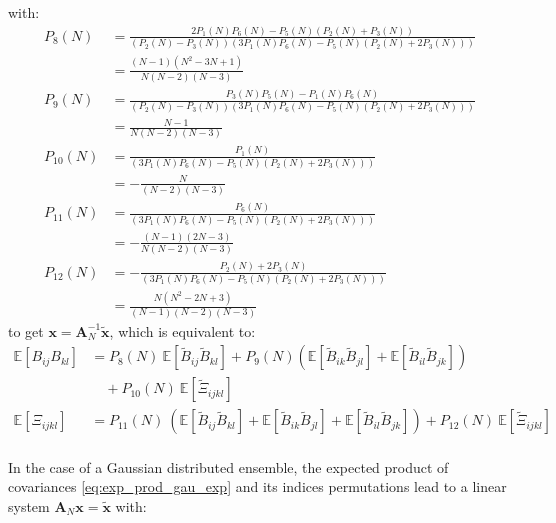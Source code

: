 \documentclass[12pt]{scrartcl}
\begin{document}
with:
\begin{subequations}
\begin{align}
P_8(N) & = \frac{2 P_1(N) P_6(N) - P_5(N)\left(P_2(N)+P_3(N)\right)}{\left(P_2(N)-P_3(N)\right)\left(3 P_1(N) P_6(N) - P_5(N) \left(P_2(N) + 2P_3(N)\right)\right)} \nonumber \\
& = \frac{(N-1)(N^2-3N+1)}{N(N-2)(N-3)} \\
P_9(N) & = \frac{P_3(N) P_5(N) - P_1(N) P_6(N)}{\left(P_2(N)-P_3(N)\right)\left(3 P_1(N) P_6(N) - P_5(N) \left(P_2(N) + 2 P_3(N)\right)\right)} \nonumber \\
& = \frac{N-1}{N(N-2)(N-3)} \\
P_{10}(N) & = \frac{P_1(N)}{\left(3 P_1(N) P_6(N) - P_5(N) \left(P_2(N) + 2P_3(N)\right)\right)} \nonumber \\
& = -\frac{N}{(N-2)(N-3)} \\
P_{11}(N) & = \frac{P_6(N)}{\left(3 P_1(N) P_6(N) - P_5(N) \left(P_2(N) + 2P_3(N)\right)\right)} \nonumber \\
& = -\frac{(N-1)(2N-3)}{N(N-2)(N-3)} \\
P_{12}(N) & = -\frac{P_2(N)+2 P_3(N)}{\left(3 P_1(N) P_6(N) - P_5(N) \left(P_2(N) + 2P_3(N)\right)\right)} \nonumber \\
& = \frac{N(N^2-2N+3)}{(N-1)(N-2)(N-3)}
\end{align}
\end{subequations}
to get $\mathbf{x} = \mathbf{A}_N^{-1} \widetilde{\mathbf{x}}$, which is equivalent to:
\begin{subequations}
\begin{align}
\label{eq:prod_asy_cov}
\mathbb{E} \left[B_{ij} B_{kl}\right] & = P_8(N) \ \mathbb{E} \left[\widetilde{B}_{ij} \widetilde{B}_{kl}\right] + P_9(N) \left(\mathbb{E} \left[\widetilde{B}_{ik} \widetilde{B}_{jl}\right] + \mathbb{E} \left[\widetilde{B}_{il} \widetilde{B}_{jk}\right]\right) \nonumber \\
& \quad + P_{10}(N) \ \mathbb{E} \left[\widetilde{\Xi}_{ijkl}\right] \\
\label{eq:asy_mom_4}
\mathbb{E} \left[\Xi_{ijkl}\right] & = P_{11}(N) \ \left(\mathbb{E} \left[\widetilde{B}_{ij} \widetilde{B}_{kl}\right] + \mathbb{E} \left[\widetilde{B}_{ik} \widetilde{B}_{jl}\right] + \mathbb{E} \left[\widetilde{B}_{il} \widetilde{B}_{jk}\right]\right) + P_{12}(N) \ \mathbb{E} \left[\widetilde{\Xi}_{ijkl}\right]
\end{align}
\end{subequations}
$  $\\
In the case of a Gaussian distributed ensemble, the expected product of covariances \eqref{eq:exp_prod_gau_exp} and its indices permutations lead to a linear system $\mathbf{A}_N \mathbf{x} = \widetilde{\mathbf{x}}$ with:
\end{document}
